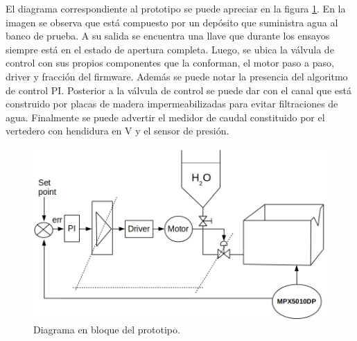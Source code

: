 El diagrama correspondiente al prototipo se puede apreciar en la figura \ref{fig:Diagrama en bloque del prototipo}. En la imagen se observa que está compuesto por un depósito que suministra agua al banco de prueba. A su salida se encuentra una llave que durante los ensayos siempre está en el estado de apertura completa. Luego, se ubica la válvula de control con sus propios componentes que la conforman, el motor paso a paso, driver y fracción del firmware. Además se puede notar la presencia del algoritmo de control PI. Posterior a la válvula de control se puede dar con el canal que está construido por placas de madera impermeabilizadas para evitar filtraciones de agua. Finalmente se puede advertir el medidor de caudal constituido por el vertedero  con hendidura en V y el sensor de presión.
\begin{figure}[h]
	\centering
	\includegraphics[scale=.60]{./Figures/Diagrama-prototipoII.png}
	\caption{Diagrama en bloque del prototipo.}
	\label{fig:Diagrama en bloque del prototipo}
	\end{figure}	
	

